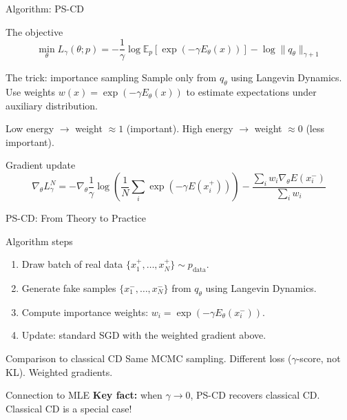 \documentclass{beamer}
\begin{document}
\begin{frame}{Algorithm: PS-CD}
\small
\begin{block}{The objective}
$$\min_\theta L_\gamma(\theta; p) = -\frac{1}{\gamma}\log\mathbb{E}_{p}[\exp(-\gamma E_\theta(x))] - \log\|q_\theta\|_{\gamma+1}$$
\end{block}

\begin{block}{The trick: importance sampling}
Sample only from $q_\theta$ using Langevin Dynamics. Use weights $w(x) = \exp(-\gamma E_\theta(x))$ to estimate expectations under auxiliary distribution.

Low energy $\to$ weight $\approx 1$ (important).
High energy $\to$ weight $\approx 0$ (less important).
\end{block}

\begin{block}{Gradient update}
$$\nabla_\theta L^N_\gamma = -\nabla_\theta\frac{1}{\gamma}\log\left(\frac{1}{N}\sum_i\exp(-\gamma E(x_i^+))\right) - \frac{\sum_i w_i \nabla_\theta E(x_i^-)}{\sum_i w_i}$$
\end{block}
\end{frame}


\begin{frame}{PS-CD: From Theory to Practice}
\small
\begin{block}{Algorithm steps}
\begin{enumerate}
    \item Draw batch of real data $\{x_1^+, \ldots, x_N^+\} \sim p_{\text{data}}$.
    \item Generate fake samples $\{x_1^-, \ldots, x_N^-\}$ from $q_\theta$ using Langevin Dynamics.
    \item Compute importance weights: $w_i = \exp(-\gamma E_\theta(x_i^-))$.
    \item Update: standard SGD with the weighted gradient above.
\end{enumerate}
\end{block}

\begin{block}{Comparison to classical CD}
Same MCMC sampling. Different loss ($\gamma$-score, not KL). Weighted gradients.
\end{block}

\begin{block}{Connection to MLE}
\textbf{Key fact:} when $\gamma \to 0$, PS-CD recovers classical CD. Classical CD is a special case!
\end{block}
\end{frame}
\end{document}
